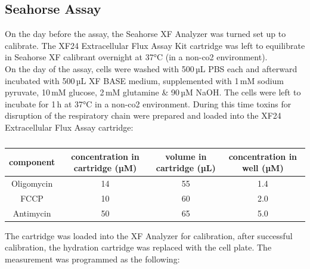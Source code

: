     \subsection{Seahorse Assay}
    On the day before the assay, the Seahorse XF Analyzer was turned set up to calibrate. The XF24 Extracellular Flux Assay Kit cartridge was left to equilibrate in Seahorse XF calibrant overnight at 37°C (in a non-\ac{co2} environment).\\
    On the day of the assay, cells were washed with 500\,µL PBS each and afterward incubated with 500\,µL XF BASE medium, supplemented with 1\,mM sodium pyruvate, 10\,mM glucose, 2\,mM glutamine \& 90\,µM NaOH. The cells were left to incubate for 1\,h at 37°C in a non-\ac{co2} environment. During this time toxins for disruption of the respiratory chain were prepared and loaded into the XF24 Extracellular Flux Assay cartridge:

    \begin{table}[h]
    \capstart
    \centering
    \begin{minipage}{\captionwidth}
        \caption[toxins for seahorse]{}
        \label{tab:seahorse_toxins}
    \end{minipage}
    \begin{tabular}{|c|c|c|c|}
        \hline
        component  & concentration in cartridge (µM) & volume in cartridge (µL) & concentration in well (µM) \\ \hline
        Oligomycin & 14                             & 55                      & 1.4                        \\
        FCCP       & 10                             & 60                      & 2.0                        \\
        Antimycin  & 50                             & 65                      & 5.0                        \\ \hline
    \end{tabular}
    \end{table}

    The cartridge was loaded into the XF Analyzer for calibration, after successful calibration, the hydration cartridge was replaced with the cell plate. The measurement was programmed as the following:

